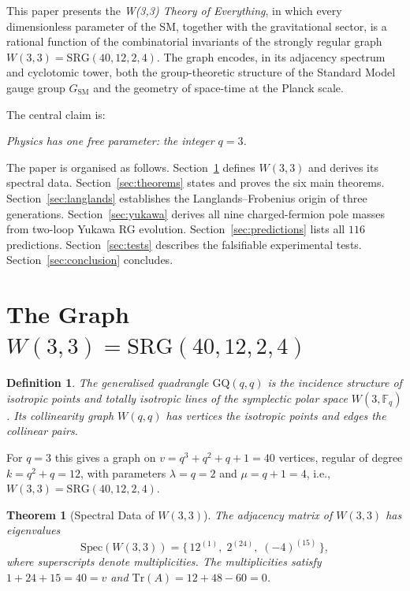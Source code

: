 \documentclass[12pt,a4paper]{article}
\newtheorem{theorem}{Theorem}
\newtheorem{definition}{Definition}
\newcommand{\W}{W(3,3)}
\newcommand{\SRG}{\mathrm{SRG}(40,12,2,4)}
\begin{document}
This paper presents the \emph{W(3,3) Theory of Everything}, in which every
dimensionless parameter of the SM, together with the gravitational sector, is
a rational function of the combinatorial invariants of the strongly regular
graph $\W = \SRG$.
The graph encodes, in its adjacency spectrum and cyclotomic tower, both the
group-theoretic structure of the Standard Model gauge group $G_{\mathrm{SM}}$
and the geometry of space-time at the Planck scale.

The central claim is:
\begin{center}
\textit{Physics has one free parameter: the integer $q = 3$.}
\end{center}

The paper is organised as follows.
Section~\ref{sec:graph} defines $\W$ and derives its spectral data.
Section~\ref{sec:theorems} states and proves the six main theorems.
Section~\ref{sec:langlands} establishes the Langlands--Frobenius origin of
three generations.
Section~\ref{sec:yukawa} derives all nine charged-fermion pole masses
from two-loop Yukawa RG evolution.
Section~\ref{sec:predictions} lists all $116$ predictions.
Section~\ref{sec:tests} describes the falsifiable experimental tests.
Section~\ref{sec:conclusion} concludes.

\section{The Graph $\W = \SRG$}
\label{sec:graph}

\begin{definition}
The \emph{generalised quadrangle} $\mathrm{GQ}(q,q)$ is the incidence
structure of isotropic points and totally isotropic lines of the symplectic
polar space $W(3,\mathbb{F}_q)$.
Its \emph{collinearity graph} $W(q,q)$ has vertices the isotropic points and
edges the collinear pairs.
\end{definition}

For $q=3$ this gives a graph on $v = q^3+q^2+q+1 = 40$ vertices,
regular of degree $k = q^2+q = 12$, with parameters
$\lambda = q = 2$ and $\mu = q+1 = 4$, i.e., $\W = \SRG$.

\begin{theorem}[Spectral Data of $\W$]
The adjacency matrix of $\W$ has eigenvalues
\begin{equation}
  \mathrm{Spec}(\W) = \{\, 12^{(1)},\; 2^{(24)},\; (-4)^{(15)} \,\},
  \label{eq:spectrum}
\end{equation}
where superscripts denote multiplicities. The multiplicities satisfy
$1 + 24 + 15 = 40 = v$ and $\mathrm{Tr}(A) = 12 + 48 - 60 = 0$.
\end{theorem}
\end{document}
